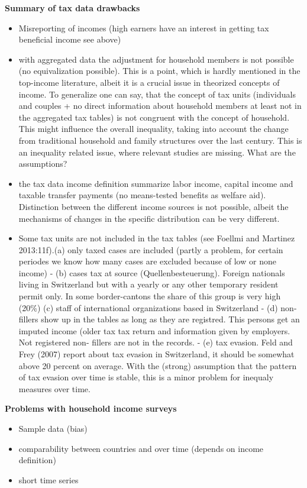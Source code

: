 \textbf{Summary of tax data drawbacks}
\begin{itemize}
\item Misreporting of incomes (high earners have an interest in getting tax beneficial income see above)
\item with aggregated data the adjustment for household members is not possible (no equivalization possible). This is a point, which is hardly mentioned in the top-income literature, albeit it is a crucial issue in theorized concepts of income. To generalize one can say, that the concept of tax units (individuals and couples + no direct information about household members at least not in the aggregated tax tables) is not congruent with the concept of household. This might influence the overall inequality, taking into account the change from traditional household and family structures over the last century. This is an inequality related issue, where relevant studies are missing. What are the assumptions?
\item the tax data income definition summarize labor income, capital income and taxable transfer payments (no means-tested benefits as welfare aid). Distinction between the different income sources is not possible, albeit the mechanisms of changes in the specific distribution can be very different.
\item Some tax units are not included in the tax tables (see Foellmi and Martinez 2013:11f).(a) only taxed cases are included (partly a problem, for certain periodes we know how many cases are excluded because of low or none income)	- (b) cases tax at source (Quellenbesteuerung). Foreign nationals living in Switzerland but with a yearly or any other temporary resident permit only. In some border-cantons the share of this group is very high (20\%) 
(c) staff of international organizations based in Switzerland	- (d) non-fillers show up in the tables as long as they are registred. This persons get an imputed income (older tax tax return and information given by employers. Not registered non-	fillers are not in the records.
- (e) tax evasion. Feld and Frey (2007) report about tax evasion in Switzerland, it should be somewhat above 20 percent on average. With the (strong) assumption that the pattern of tax evasion over time is stable, this is a minor problem for inequaly measures over time.
\end{itemize}

\textbf{Problems with household income surveys}
\begin{itemize}
\item Sample data (bias)
\item comparability between countries and over time (depends on income definition)
\item short time series
\end{itemize}

